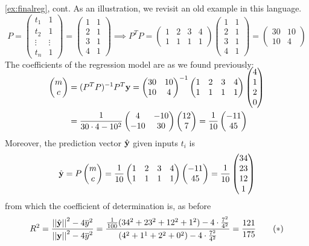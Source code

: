 \pagebreak[3]


\begin{example*}{\ref{ex:finalreg}, cont.}
	As an illustration, we revisit an old example in this language.
	\[
		P=
		\begin{pmatrix}
			t_1&1\\
			t_2&1\\
			\vdots&\vdots\\
			t_n&1
		\end{pmatrix}
		=
		\begin{pmatrix}
			1&1\\
			2&1\\
			3&1\\
			4&1
		\end{pmatrix}
		\implies P^TP=
		\begin{pmatrix}
			1&2&3&4\\
			1&1&1&1
		\end{pmatrix}
		\begin{pmatrix}
			1&1\\
			2&1\\
			3&1\\
			4&1
		\end{pmatrix}
		=
		\begin{pmatrix}
			30&10\\
			10&4
		\end{pmatrix}
	\]
	The coefficients of the regression model are as we found previously:
	\begin{align*}
		\twovec mc&=(P^TP)^{-1}P^T\vy =
		\begin{pmatrix}
			30&10\\
			10&4
		\end{pmatrix}^{-1}
		\begin{pmatrix}
			1&2&3&4\\
			1&1&1&1
		\end{pmatrix}
		\smash[t]{\fourvec 4120}\\
		&=\frac 1{30\cdot 4-10^2}
		\begin{pmatrix}
			4&-10\\
			-10&30
		\end{pmatrix}
		\twovec{12}{7} %
		=\frac 1{10}\twovec{-11}{45}
	\end{align*}
	Moreover, the prediction vector $\hat{{\mathbf{y}}}$ given inputs $t_i$ is
	\[
		\hat{{\mathbf{y}}}=P\begin{pmatrix}m\\c\end{pmatrix}=\frac 1{10}
		\begin{pmatrix}
			1&2&3&4\\
			1&1&1&1
		\end{pmatrix}
		\begin{pmatrix}-11\\45\end{pmatrix} =\frac 1{10}\begin{pmatrix}34\\23\\12\\1\end{pmatrix}
	\]
	from which the coefficient of determination is, as before
	\[
		R^2=\frac{\left| \left| \hat{{\mathbf{y}}}\right|\right|^2-4\overline{y}^2}{\left| \left| {\mathbf{y}}\right|\right|^2-4\overline{y}^2} =\frac{\frac 1{100}(34^2+23^2+12^2+1^2)-4\cdot\frac{7^2}{4^2}}{(4^2+1^1+2^2+0^2)-4\cdot\frac{7^2}{4^2}} =\frac{121}{175}
		\tag{$\ast$}
	\]
\end{example*}


